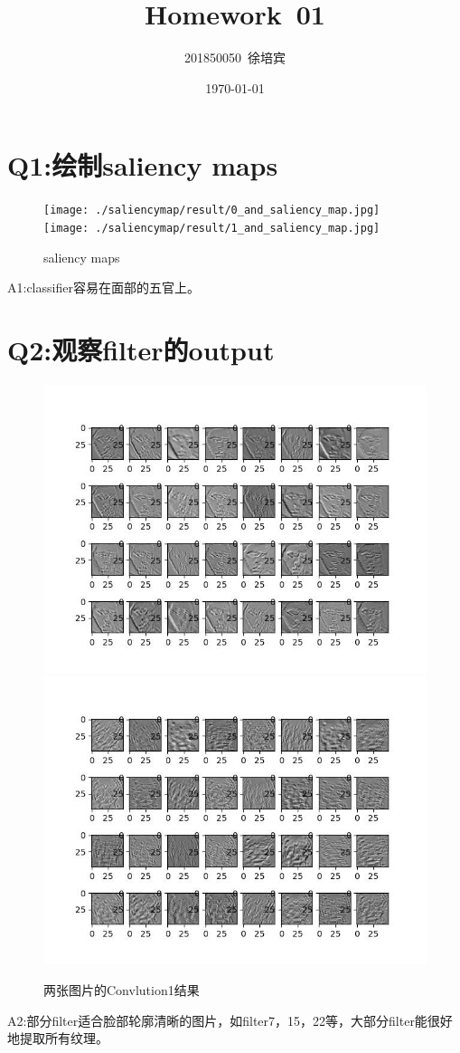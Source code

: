 \documentclass[UTF8]{article}
\title{Homework\ 01}
\author{201850050\ 徐培宾}
\date{\today}
\begin{document}
    \maketitle
    \section{Q1:绘制saliency maps}
    \begin{figure}[H]
      \centering
      \texttt{[image: ./saliencymap/result/0\_and\_saliency\_map.jpg]}
      \\[5pt]
      \texttt{[image: ./saliencymap/result/1\_and\_saliency\_map.jpg]}
      \caption{saliency maps}
    \end{figure}
    A1:classifier容易在面部的五官上。
    \section{Q2:观察filter的output}
    \begin{figure}[H]
      \centering
      \includegraphics[width = 12cm]{./conv1.jpg}
      \includegraphics[width = 12cm]{./conv1-1.jpg}
      \caption{两张图片的Convlution1结果}
    \end{figure}
    A2:部分filter适合脸部轮廓清晰的图片，如filter7，15，22等，大部分filter能很好地提取所有纹理。
\end{document}
